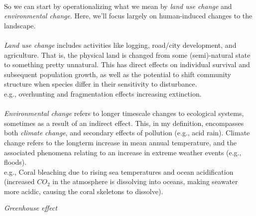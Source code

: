 \documentclass[12pt]{article}
\begin{document}
\paragraph*{}
So we can start by operationalizing what we mean by \textit{land use change} and \textit{environmental change}. Here, we'll focus largely on human-induced changes to the landscape. 



\paragraph*{}
\textit{Land use change} includes activities like logging, road/city development, and agriculture. That is, the physical land is changed from some (semi)-natural state to something pretty unnatural. This has direct effects on individual survival and subsequent population growth, as well as the potential to shift community structure when species differ in their sensitivity to disturbance. \\

e.g., overhunting and fragmentation effects increasing extinction. 







\paragraph*{}

\textit{Environmental change} refers to longer timescale changes to ecological systems, sometimes as a result of an indirect effect. This, in my definition, encompasses both \textit{climate change}, and secondary effects of pollution (e.g., acid rain). Climate change refers to the longterm increase in mean annual temperature, and the associated phenomena relating to an increase in extreme weather events (e.g., floods). \\

e.g., Coral bleaching due to rising sea temperatures and ocean acidification (increased $CO_2$ in the atmosphere is dissolving into oceans, making seawater more acidic, causing the coral skeletons to dissolve). 





\textit{Greenhouse effect} \\
\end{document}
